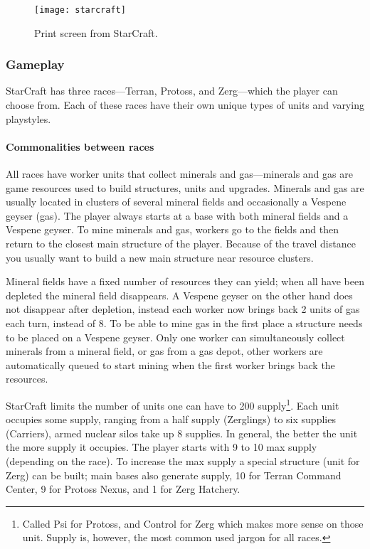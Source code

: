 \begin{figure}[htb]
\centering
\texttt{[image: starcraft]}
\caption{Print screen from StarCraft.}
\label{fig:starcraft}
\end{figure}

\subsubsection{Gameplay}
StarCraft has three races—Terran, Protoss, and Zerg—which the player can choose from. Each of these races have their own unique types of units and varying playstyles.

\paragraph{Commonalities between races}
All races have worker units that collect minerals and gas—minerals and gas are game resources used to build structures, units and upgrades. Minerals and gas are usually located in clusters of several mineral fields and occasionally a Vespene geyser (gas). The player always starts at a base with both mineral fields and a Vespene geyser. To mine minerals and gas, workers go to the fields and then return to the closest main structure of the player. Because of the travel distance you usually want to build a new main structure near resource clusters.

Mineral fields have a fixed number of resources they can yield; when all have been depleted the mineral field disappears. A Vespene geyser on the other hand does not disappear after depletion, instead each worker now brings back 2 units of gas each turn, instead of 8. To be able to mine gas in the first place a structure needs to be placed on a Vespene geyser. Only one worker can simultaneously collect minerals from a mineral field, or gas from a gas depot, other workers are automatically queued to start mining when the first worker brings back the resources.

\label{sec:starcraft_supply}
StarCraft limits the number of units one can have to 200 supply\footnote{Called Psi for Protoss, and Control for Zerg which makes more sense on those unit. Supply is, however, the most common used jargon for all races.}. Each unit occupies some supply, ranging from a half supply (Zerglings) to six supplies (Carriers), armed nuclear silos take up 8 supplies. In general, the better the unit the more supply it occupies. The player starts with 9 to 10 max supply (depending on the race). To increase the max supply a special structure (unit for Zerg) can be built; main bases also generate supply, 10 for Terran Command Center, 9 for Protoss Nexus, and 1 for Zerg Hatchery.


